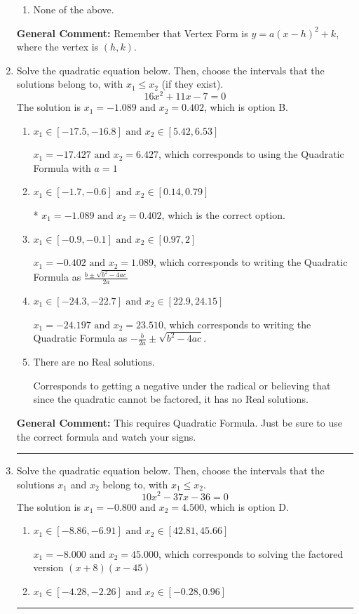 \documentclass{extbook}[14pt]
\newcommand{\litem}[1]{\item #1

\rule{\textwidth}{0.4pt}}
\begin{document}
\begin{enumerate}
{\begin{enumerate}[label=\Alph*.]
\begin{multicols}{2}
\end{multicols}\item None of the above.\end{enumerate}
\textbf{General Comment:} Remember that Vertex Form is $y = a(x-h)^2+k$, where the vertex is $(h, k)$.
}
\litem{
Solve the quadratic equation below. Then, choose the intervals that the solutions belong to, with $x_1 \leq x_2$ (if they exist).
\[ 16x^{2} +11 x -7 = 0 \]The solution is \( x_1 = -1.089 \text{ and } x_2 = 0.402 \), which is option B.\begin{enumerate}[label=\Alph*.]
\item \( x_1 \in [-17.5, -16.8] \text{ and } x_2 \in [5.42, 6.53] \)

 $x_1 = -17.427 \text{ and } x_2 = 6.427$, which corresponds to using the Quadratic Formula with $a=1$
\item \( x_1 \in [-1.7, -0.6] \text{ and } x_2 \in [0.14, 0.79] \)

* $x_1 = -1.089 \text{ and } x_2 = 0.402$, which is the correct option.
\item \( x_1 \in [-0.9, -0.1] \text{ and } x_2 \in [0.97, 2] \)

 $x_1 = -0.402 \text{ and } x_2 = 1.089$, which corresponds to writing the Quadratic Formula as $\frac{b \pm \sqrt{b^2 - 4ac}}{2a}$
\item \( x_1 \in [-24.3, -22.7] \text{ and } x_2 \in [22.9, 24.15] \)

 $x_1 = -24.197 \text{ and } x_2 = 23.510$, which corresponds to writing the Quadratic Formula as $-\frac{b}{2a} \pm \sqrt{b^2 - 4ac}$.
\item \( \text{There are no Real solutions.} \)

Corresponds to getting a negative under the radical or believing that since the quadratic cannot be factored, it has no Real solutions.
\end{enumerate}

\textbf{General Comment:} This requires Quadratic Formula. Just be sure to use the correct formula and watch your signs.
}
\litem{
Solve the quadratic equation below. Then, choose the intervals that the solutions $x_1$ and $x_2$ belong to, with $x_1 \leq x_2$.
\[ 10x^{2} -37 x -36 = 0 \]The solution is \( x_1 = -0.800 \text{ and } x_2 = 4.500 \), which is option D.\begin{enumerate}[label=\Alph*.]
\item \( x_1 \in [-8.86, -6.91] \text{ and } x_2 \in [42.81, 45.66] \)

$x_1 = -8.000 \text{ and } x_2 = 45.000$, which corresponds to solving the factored version $(x + 8)(x -45)$
\item \( x_1 \in [-4.28, -2.26] \text{ and } x_2 \in [-0.28, 0.96] \)


\end{enumerate}}
\end{enumerate}
\end{document}
